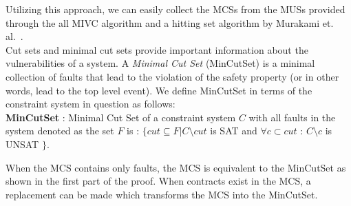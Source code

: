 Utilizing this approach, we can easily collect the MCSs from the MUSs provided through the all MIVC algorithm and a hitting set algorithm by Murakami et. al.~\cite{murakami2013efficient,gainer2017minimal}. \\

Cut sets and minimal cut sets provide important information about the vulnerabilities of a system. A \textit{Minimal Cut Set} (MinCutSet) is a minimal collection of faults that lead to the violation of the safety property (or in other words, lead to the top level event). We define MinCutSet in terms of the constraint system in question as follows:\\

\textbf{MinCutSet} : Minimal Cut Set of a constraint system $C$ with all faults in the system denoted as the set $F$ is : $\{ cut \subseteq F | C \setminus cut$ is SAT and $\forall c \subset cut$ : $C \setminus c$ is UNSAT $\}$. 

When the MCS contains only faults, the MCS is equivalent to the MinCutSet as shown in the first part of the proof. When contracts exist in the MCS, a replacement can be made which transforms the MCS into the MinCutSet. \\






























